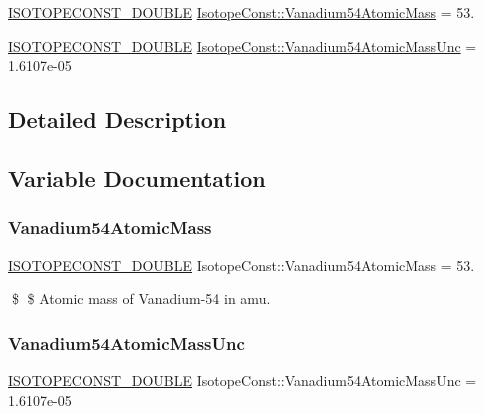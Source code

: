 \begin{DoxyCompactItemize}
\item 
\mbox{\hyperlink{group___isotope_const-_macros_ga8f45a7272ce02c0b4c65c44636ed719a}{I\+S\+O\+T\+O\+P\+E\+C\+O\+N\+S\+T\+\_\+\+D\+O\+U\+B\+LE}} \mbox{\hyperlink{group___isotope_const-_vanadium-_v54_ga072ab7915d3f9d6e29d6cc6eaa952528}{Isotope\+Const\+::\+Vanadium54\+Atomic\+Mass}} = 53.
\item 
\mbox{\hyperlink{group___isotope_const-_macros_ga8f45a7272ce02c0b4c65c44636ed719a}{I\+S\+O\+T\+O\+P\+E\+C\+O\+N\+S\+T\+\_\+\+D\+O\+U\+B\+LE}} \mbox{\hyperlink{group___isotope_const-_vanadium-_v54_ga3b2b969bbeda99464f845baf332ec499}{Isotope\+Const\+::\+Vanadium54\+Atomic\+Mass\+Unc}} = 1.\+6107e-\/05
\end{DoxyCompactItemize}


\subsection{Detailed Description}


\subsection{Variable Documentation}
\mbox{\label{group___isotope_const-_vanadium-_v54_ga072ab7915d3f9d6e29d6cc6eaa952528}} 
\subsubsection{\texorpdfstring{Vanadium54\+Atomic\+Mass}{Vanadium54AtomicMass}}
{\footnotesize\ttfamily \mbox{\hyperlink{group___isotope_const-_macros_ga8f45a7272ce02c0b4c65c44636ed719a}{I\+S\+O\+T\+O\+P\+E\+C\+O\+N\+S\+T\+\_\+\+D\+O\+U\+B\+LE}} Isotope\+Const\+::\+Vanadium54\+Atomic\+Mass = 53.}

\$ \$ Atomic mass of Vanadium-\/54 in amu. \mbox{\label{group___isotope_const-_vanadium-_v54_ga3b2b969bbeda99464f845baf332ec499}} 
\subsubsection{\texorpdfstring{Vanadium54\+Atomic\+Mass\+Unc}{Vanadium54AtomicMassUnc}}
{\footnotesize\ttfamily \mbox{\hyperlink{group___isotope_const-_macros_ga8f45a7272ce02c0b4c65c44636ed719a}{I\+S\+O\+T\+O\+P\+E\+C\+O\+N\+S\+T\+\_\+\+D\+O\+U\+B\+LE}} Isotope\+Const\+::\+Vanadium54\+Atomic\+Mass\+Unc = 1.\+6107e-\/05}


